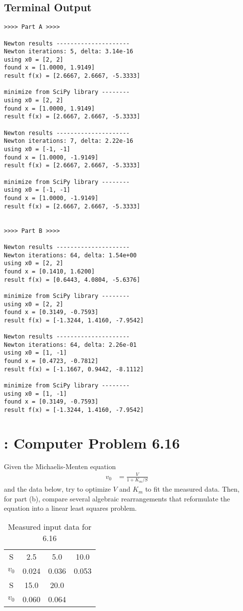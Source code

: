 \documentclass[paper=a4, fontsize=11pt]{scrartcl}
\numberwithin{equation}{section}		%
\numberwithin{figure}{section}			%
\numberwithin{table}{section}				%
\begin{document}
\vspace{4mm}
\subsection{Terminal Output}
\begin{verbatim}
>>>> Part A >>>>

Newton results ---------------------
Newton iterations: 5, delta: 3.14e-16
using x0 = [2, 2]
found x = [1.0000, 1.9149]
result f(x) = [2.6667, 2.6667, -5.3333]

minimize from SciPy library --------
using x0 = [2, 2]
found x = [1.0000, 1.9149]
result f(x) = [2.6667, 2.6667, -5.3333]

Newton results ---------------------
Newton iterations: 7, delta: 2.22e-16
using x0 = [-1, -1]
found x = [1.0000, -1.9149]
result f(x) = [2.6667, 2.6667, -5.3333]

minimize from SciPy library --------
using x0 = [-1, -1]
found x = [1.0000, -1.9149]
result f(x) = [2.6667, 2.6667, -5.3333]


>>>> Part B >>>>

Newton results ---------------------
Newton iterations: 64, delta: 1.54e+00
using x0 = [2, 2]
found x = [0.1410, 1.6200]
result f(x) = [0.6443, 4.0804, -5.6376]

minimize from SciPy library --------
using x0 = [2, 2]
found x = [0.3149, -0.7593]
result f(x) = [-1.3244, 1.4160, -7.9542]

Newton results ---------------------
Newton iterations: 64, delta: 2.26e-01
using x0 = [1, -1]
found x = [0.4723, -0.7812]
result f(x) = [-1.1667, 0.9442, -8.1112]

minimize from SciPy library --------
using x0 = [1, -1]
found x = [0.3149, -0.7593]
result f(x) = [-1.3244, 1.4160, -7.9542]
\end{verbatim}


\pagebreak
\section{: Computer Problem 6.16}
Given the Michaelis-Menten equation
\begin{align*}
	v_0 &= \frac{V}{1 + K_m/S}
\end{align*}
and the data below, try to optimize $V$ and $K_m$ to fit the measured data. Then, for part (b), compare several algebraic rearrangements that reformulate the equation into a linear least squares problem.
\begin{table}[!hbt]
	\begin{center}
		\caption{Measured input data for 6.16}
		\label{tab:6.16input}
		\begin{tabular}{ c|c c c }
			S & 2.5 & 5.0 & 10.0\\
			$v_0$ & 0.024 & 0.036 & 0.053 \\
			\hline
			S & 15.0 & 20.0 & \\
			$v_0$ & 0.060 & 0.064 & \\
		\end{tabular}
	\end{center}
\end{table}
\end{document}

